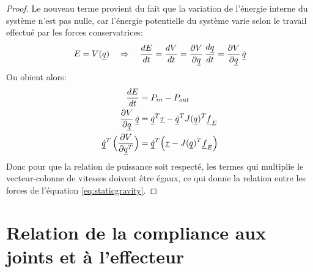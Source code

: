 
\begin{proof}
Le nouveau terme provient du fait que la variation de l'énergie interne du système n'est pas nulle, car l'énergie potentielle du système varie selon le travail effectué par les forces conservatrices:
\begin{align}
E = V( \underline{q} ) \quad \Rightarrow \quad \frac{dE}{dt} = \frac{dV}{dt} = \frac{\partial V}{ \partial \underline{q}} \, \frac{d \underline{q}}{dt} = \frac{\partial V}{ \partial \underline{q}} \, \underline{\dot{q}}
\end{align}
On obient alors:
\begin{align}
\frac{dE}{dt} &= P_{in} - P_{out} \\
\frac{\partial V}{ \partial \underline{q}} \, \underline{\dot{q}} &=  \underline{\dot{q}}^T \underline{\tau} - \underline{\dot{q}}^T  J( \underline{q})^T \underline{f}_E  \\
\underline{\dot{q}}^T  \, \Big(  \frac{\partial V}{ \partial \underline{q}^T} \Big) &=  \underline{\dot{q}}^T  \Big(\underline{\tau} -  J( \underline{q})^T \underline{f}_E  \Big)
\end{align}
Donc pour que la relation de puissance soit respecté, les termes qui multiplie le vecteur-colonne de vitesses doivent être égaux, ce qui donne la relation entre les forces de l'équation \eqref{eq:staticgravity}.
\end{proof}




\section{Relation de la compliance aux joints et à l'effecteur}
\label{sec:manipcompliance}


